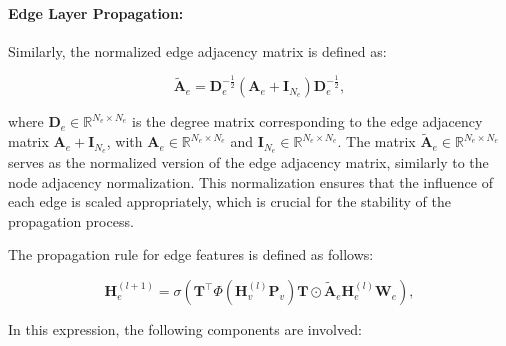 \paragraph{Edge Layer Propagation:}

Similarly, the normalized edge adjacency matrix is defined as:

\begin{equation}
    \tilde{\mathbf{A}}_e = \mathbf{D}_e^{-\frac{1}{2}} \left(\mathbf{A}_e + \mathbf{I}_{N_e}\right) \mathbf{D}_e^{-\frac{1}{2}},
    \label{eq:normalized_edge_adjacency}
\end{equation}




\noindent where \( \mathbf{D}_e \in \mathbb{R}^{N_e \times N_e} \) is the degree matrix corresponding to the edge adjacency matrix \( \mathbf{A}_e + \mathbf{I}_{N_e} \), with \( \mathbf{A}_e \in \mathbb{R}^{N_e \times N_e} \) and \( \mathbf{I}_{N_e} \in \mathbb{R}^{N_e \times N_e} \). The matrix \( \tilde{\mathbf{A}}_e \in \mathbb{R}^{N_e \times N_e} \) serves as the normalized version of the edge adjacency matrix, similarly to the node adjacency normalization. This normalization ensures that the influence of each edge is scaled appropriately, which is crucial for the stability of the propagation process.

The propagation rule for edge features is defined as follows:


\begin{equation}
    \mathbf{H}^{(l+1)}_e = \sigma\left(\mathbf{T}^\top \Phi\left(\mathbf{H}^{(l)}_v \mathbf{P}_v\right) \mathbf{T} \odot \tilde{\mathbf{A}}_e \mathbf{H}^{(l)}_e \mathbf{W}_e\right),
\end{equation}



In this expression, the following components are involved:

